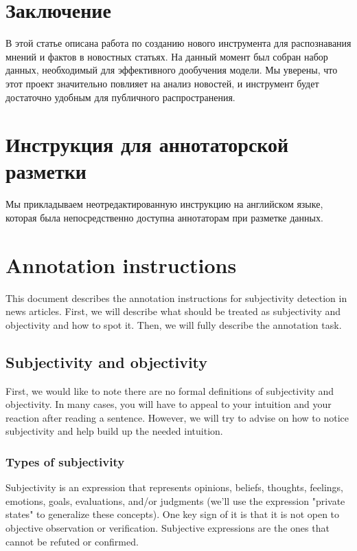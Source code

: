 \documentclass[conference]{IEEEtran}
\begin{document}
\section{Заключение}
В этой статье описана работа по созданию нового инструмента для распознавания мнений и фактов в новостных статьях. На данный момент был собран набор данных, необходимый для эффективного дообучения модели. Мы уверены, что этот проект значительно повлияет на анализ новостей, и инструмент будет достаточно удобным для публичного распространения.




\vspace{12pt}

\newpage
\appendices
\section{Инструкция для аннотаторской разметки}
Мы прикладываем неотредактированную инструкцию на английском языке, которая была непосредственно доступна аннотаторам при разметке данных.

\section*{Annotation instructions}
This document describes the annotation instructions for subjectivity detection in news articles. First, we will describe what should be treated as subjectivity and objectivity and how to spot it. Then, we will fully describe the annotation task.

\subsection*{Subjectivity and objectivity}
First, we would like to note there are no formal definitions of subjectivity and objectivity. In many cases, you will have to appeal to your intuition and your reaction after reading a sentence. However, we will try to advise on how to notice subjectivity and help build up the needed intuition.

\subsubsection*{Types of subjectivity}
Subjectivity is an expression that represents opinions, beliefs, thoughts, feelings, emotions, goals, evaluations, and/or judgments (we'll use the expression "private states" to generalize these concepts). One key sign of it is that it is not open to objective observation or verification. Subjective expressions are the ones that cannot be refuted or confirmed.
\end{document}
